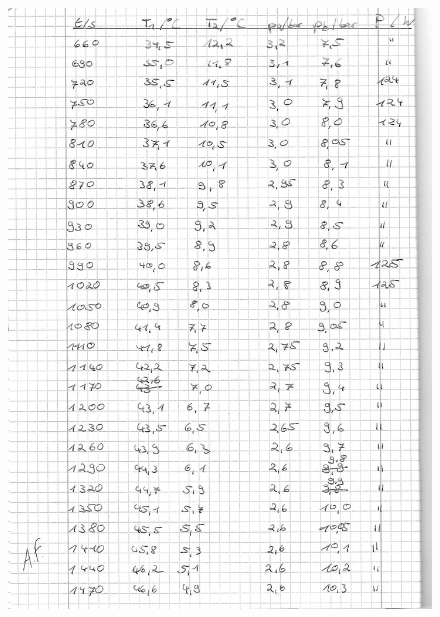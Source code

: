 \begin{figure}[htp]
  \centering
  \includegraphics[width=\textwidth]{content/originaldaten/3.jpg}
\end{figure}
